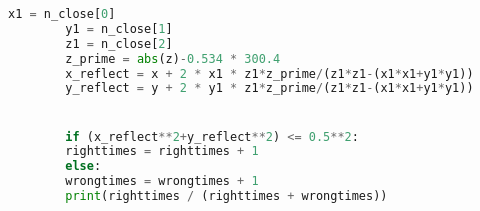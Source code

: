 \documentclass{cumcmthesis}
\begin{document}
\begin{appendices}
\begin{lstlisting}[language={python}]
		x1 = n_close[0]
		y1 = n_close[1]
		z1 = n_close[2]
		z_prime = abs(z)-0.534 * 300.4
		x_reflect = x + 2 * x1 * z1*z_prime/(z1*z1-(x1*x1+y1*y1))
		y_reflect = y + 2 * y1 * z1*z_prime/(z1*z1-(x1*x1+y1*y1))


		if (x_reflect**2+y_reflect**2) <= 0.5**2:
		righttimes = righttimes + 1
		else:
		wrongtimes = wrongtimes + 1
		print(righttimes / (righttimes + wrongtimes))

		\end{lstlisting}  %
\end{appendices}
\end{document}
